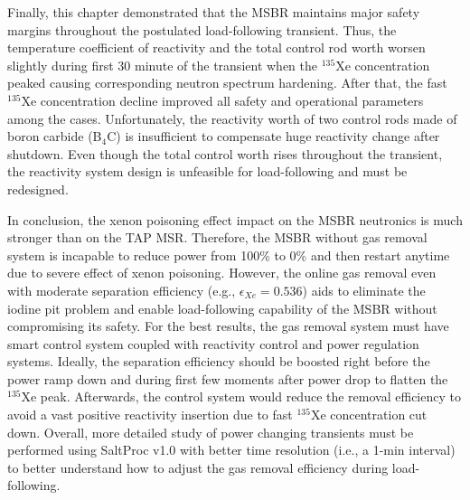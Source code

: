 Finally, this chapter demonstrated that the \gls{MSBR} maintains major safety 
margins throughout the postulated load-following transient. Thus, the 
temperature coefficient of reactivity and the total control rod worth worsen 
slightly during first 30 minute of the transient when the $^{135}$Xe 
concentration peaked causing corresponding neutron spectrum hardening. After 
that, the fast $^{135}$Xe concentration decline improved all safety and 
operational parameters among the cases. Unfortunately, the reactivity worth of 
two control rods made of boron carbide (B$_4$C) is insufficient to compensate 
huge reactivity change after shutdown. Even though the total control worth 
rises throughout the transient, the reactivity system design is unfeasible
for load-following and must be redesigned. 

In conclusion, the xenon poisoning effect impact on the \gls{MSBR} neutronics 
is much stronger than on the \gls{TAP} \gls{MSR}. Therefore, the \gls{MSBR} 
without 
gas removal system is incapable to reduce power from 100\% to 0\% and then 
restart anytime due to severe effect of xenon poisoning. However, the online 
gas removal even with moderate separation efficiency (e.g., 
$\epsilon_{Xe}=0.536$) aids to eliminate the iodine pit problem and enable 
load-following capability of the \gls{MSBR} without compromising its safety. 
For the best results, the gas removal system must have smart control system 
coupled with reactivity control and power regulation systems. Ideally, the 
separation efficiency should be boosted right before the power ramp down and 
during first few moments after power drop to flatten the $^{135}$Xe peak. 
Afterwards, the control system would reduce the removal efficiency to avoid a
vast positive reactivity insertion due to fast $^{135}$Xe concentration cut 
down. Overall, more detailed study of power changing transients must be 
performed using SaltProc v1.0 with better time resolution (i.e., a 1-min 
interval) to better understand how to adjust the gas removal efficiency during 
load-following.
